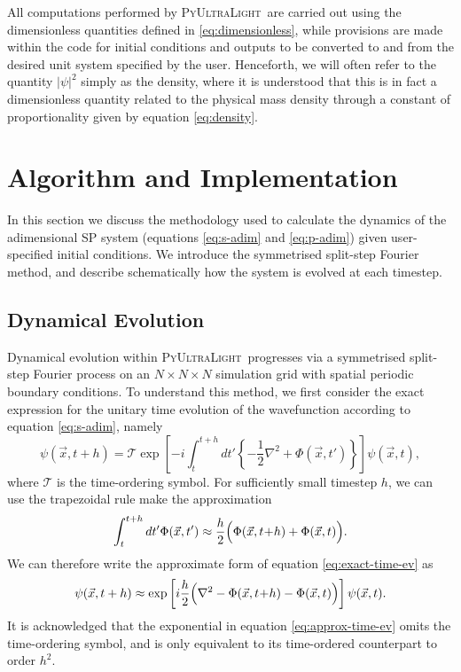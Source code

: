 \documentclass[a4paper,11pt]{article}
\newcommand{\PyUltraLight}{\textsc{PyUltraLight}\xspace}
\begin{document}
All computations performed by \PyUltraLight\ are carried out using the dimensionless quantities defined in \ref{eq:dimensionless}, while provisions are made within the code for initial conditions and outputs to be converted to and from the desired unit system specified by the user. Henceforth, we will often refer to the quantity $\vert\psi\vert^2$ simply as the density, where it is understood that this is in fact a dimensionless quantity related to the physical mass density through a constant of proportionality given by equation \ref{eq:density}.




\section{Algorithm and Implementation}\label{sec:implementation}

In this section we discuss the methodology used to calculate the dynamics of the adimensional SP system (equations \ref{eq:s-adim} and \ref{eq:p-adim}) given user-specified initial conditions. We introduce the symmetrised split-step Fourier method, and describe schematically how the system is evolved at each timestep. 

\subsection{Dynamical Evolution}\label{sec:dynamics}

Dynamical evolution within \PyUltraLight\ progresses via a symmetrised split-step Fourier process on an $N\times N\times N$ simulation grid with spatial periodic boundary conditions. To understand this method, we first consider the exact expression for the unitary time evolution of the wavefunction according to equation \ref{eq:s-adim}, namely
\begin{equation}\label{eq:exact-time-ev}
    \psi(\vec{x},t+h)=\mathcal{T}\operatorname{exp}\left[-i\int_t^{t+h}dt'\left\{-\frac{1}{2}\nabla^2+\Phi(\vec{x},t')\right\}\right]\psi(\vec{x},t),
\end{equation}
where $\mathcal{T}$ is the time-ordering symbol. For sufficiently small timestep $h$, we can use the trapezoidal rule make the approximation
\begin{equation}
    \int_t^{t+h}dt'\Phi(\vec{x},t')\approx \frac{h}{2}\Big(\Phi(\vec{x},t\hspace*{-.2em}+\hspace*{-.2em}h)+\Phi(\vec{x},t)\Big).
\end{equation}
We can therefore write the approximate form of equation \ref{eq:exact-time-ev} as
\begin{equation}\label{eq:approx-time-ev}
    \psi(\vec{x},t+h)\approx \operatorname{exp}\left[i\frac{h}{2}\Big(\nabla^2-\Phi(\vec{x},t\hspace*{-.2em}+\hspace*{-.2em}h)-\Phi(\vec{x},t)\Big)\right]\psi(\vec{x},t).
\end{equation}
It is acknowledged that the exponential in equation \ref{eq:approx-time-ev} omits the time-ordering symbol, and is only equivalent to its time-ordered counterpart to order $h^2$.
\end{document}

